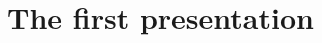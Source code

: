 \documentclass[hott-all.tex]{subfiles}
\begin{document}
\section{The first presentation}
%
%
%
%
\end{document}
